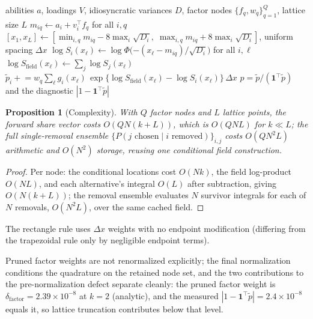 \documentclass[12pt]{article}
\newtheorem{proposition}{Proposition}
\theoremstyle{remark}
\begin{document}
\begin{algorithm}[H]
\caption{All-share forward pass (min-wins; reflected from argmax by $a = -\mu$)}
\label{alg:forward}
\begin{algorithmic}[1]
\Require abilities $a$, loadings $V$, idiosyncratic variances $D$, factor
nodes $\{f_q, w_q\}_{q=1}^{Q}$, lattice size $L$
\State $m_{iq} \gets a_i + v_i^\top f_q$ for all $i, q$
\State $[x_1, x_L] \gets [\min_{i,q} m_{iq} - 8\max_i \sqrt{D_i},\;
\max_{i,q} m_{iq} + 8\max_i \sqrt{D_i}]$, uniform spacing $\Delta x$
  \State $\log S_i(x_\ell) \gets \log\Phi\big({-(x_\ell -
  m_{iq})}/{\sqrt{D_i}}\big)$ for all $i, \ell$
  \State $\log S_{\mathrm{field}}(x_\ell) \gets \sum_j \log
  S_j(x_\ell)$
  \State $\tilde p_i \mathrel{+}= w_q \sum_\ell g_i(x_\ell)\,
  \exp\{\log S_{\mathrm{field}}(x_\ell) - \log S_i(x_\ell)\}\,
  \Delta x$ 
\EndFor
\State \Return $p = \tilde p / (\mathbf{1}^\top \tilde p)$ and the
diagnostic $|1 - \mathbf{1}^\top \tilde p|$
\end{algorithmic}
\end{algorithm}

\begin{proposition}[Complexity]\label{prop:complexity}
With $Q$ factor nodes and $L$ lattice points, the forward share vector
costs $O(QN(k+L))$, which is $O(QNL)$ for $k \ll L$; the full
single-removal ensemble $\{P(j \text{ chosen} \mid i
\text{ removed})\}_{i,j}$ costs $O(QN^2L)$ arithmetic and $O(N^2)$ storage,
reusing one conditional field construction.
\end{proposition}
\begin{proof}
Per node: the conditional locations cost $O(Nk)$, the field log-product
$O(NL)$, and each alternative's integral $O(L)$ after subtraction, giving
$O(N(k+L))$; the removal ensemble evaluates $N$
survivor integrals for each of $N$ removals, $O(N^2L)$, over the same cached
field.
\end{proof}

The rectangle rule uses $\Delta x$ weights with no endpoint modification
(differing from the trapezoidal rule only by negligible endpoint terms).

Pruned factor weights are not renormalized explicitly; the final
normalization conditions the quadrature on the retained node set, and the
two contributions to the pre-normalization defect separate cleanly: the
pruned factor weight is $\delta_{\mathrm{factor}} = 2.39\times10^{-8}$
at $k=2$ (analytic), and the measured $|1 - \mathbf{1}^\top \tilde p| =
2.4\times10^{-8}$ equals it, so lattice truncation contributes below that
level.
\end{document}
